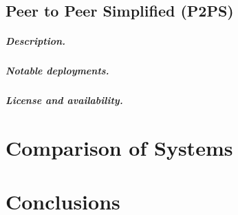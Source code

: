 \documentclass[a4paper]{report}
\begin{document}
\section{Peer to Peer Simplified (P2PS)}

\paragraph{Description.}

\paragraph{Notable deployments.}

\paragraph{License and availability.}




\chapter{Comparison of Systems}

\chapter{Conclusions}



\end{document}
